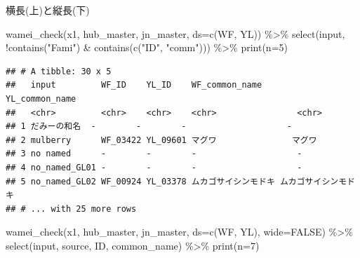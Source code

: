 \documentclass[
  a5paper,
  landscape,
  notitlepage]{report}
\newenvironment{Shaded}{\begin{snugshade}}{\end{snugshade}}
\newcommand{\AttributeTok}[1]{\textcolor[rgb]{0.77,0.63,0.00}{#1}}
\newcommand{\ConstantTok}[1]{\textcolor[rgb]{0.00,0.00,0.00}{#1}}
\newcommand{\DecValTok}[1]{\textcolor[rgb]{0.00,0.00,0.81}{#1}}
\newcommand{\FunctionTok}[1]{\textcolor[rgb]{0.00,0.00,0.00}{#1}}
\newcommand{\NormalTok}[1]{#1}
\newcommand{\SpecialCharTok}[1]{\textcolor[rgb]{0.00,0.00,0.00}{#1}}
\newcommand{\StringTok}[1]{\textcolor[rgb]{0.31,0.60,0.02}{#1}}
\begin{document}
\newpage

\fontsize{32pt}{32pt}\selectfont

\begin{center}
横長(上)と縦長(下)
\end{center}

\fontsize{12pt}{12pt}\selectfont

\begin{Shaded}
\begin{Highlighting}[]
\FunctionTok{wamei\_check}\NormalTok{(x1, hub\_master, jn\_master, }\AttributeTok{ds=}\FunctionTok{c}\NormalTok{(WF, YL)) }\SpecialCharTok{\%\textgreater{}\%} 
  \FunctionTok{select}\NormalTok{(input, }\SpecialCharTok{!}\FunctionTok{contains}\NormalTok{(}\StringTok{"Fami"}\NormalTok{) }\SpecialCharTok{\&} \FunctionTok{contains}\NormalTok{(}\FunctionTok{c}\NormalTok{(}\StringTok{"ID"}\NormalTok{, }\StringTok{"comm"}\NormalTok{))) }\SpecialCharTok{\%\textgreater{}\%} \FunctionTok{print}\NormalTok{(}\AttributeTok{n=}\DecValTok{5}\NormalTok{)}
\end{Highlighting}
\end{Shaded}

\begin{verbatim}
## # A tibble: 30 x 5
##   input         WF_ID    YL_ID    WF_common_name       YL_common_name      
##   <chr>         <chr>    <chr>    <chr>                <chr>               
## 1 だみーの和名  -        -        -                    -                   
## 2 mulberry      WF_03422 YL_09601 マグワ               マグワ              
## 3 no named      -        -        -                    -                   
## 4 no_named_GL01 -        -        -                    -                   
## 5 no_named_GL02 WF_00924 YL_03378 ムカゴサイシンモドキ ムカゴサイシンモドキ
## # ... with 25 more rows
\end{verbatim}

\begin{Shaded}
\begin{Highlighting}[]
\FunctionTok{wamei\_check}\NormalTok{(x1, hub\_master, jn\_master, }\AttributeTok{ds=}\FunctionTok{c}\NormalTok{(WF, YL), }\AttributeTok{wide=}\ConstantTok{FALSE}\NormalTok{) }\SpecialCharTok{\%\textgreater{}\%}
  \FunctionTok{select}\NormalTok{(input, source, ID, common\_name) }\SpecialCharTok{\%\textgreater{}\%} \FunctionTok{print}\NormalTok{(}\AttributeTok{n=}\DecValTok{7}\NormalTok{)}
\end{Highlighting}
\end{Shaded}
\end{document}
